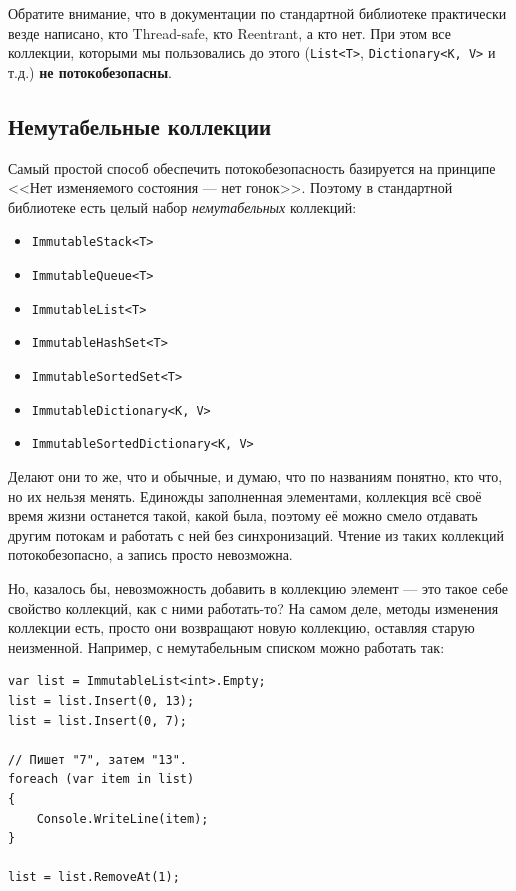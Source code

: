 \documentclass{../../text-style}
\begin{document}
Обратите внимание, что в документации по стандартной библиотеке практически везде написано, кто Thread-safe, кто Reentrant, а кто нет. При этом все коллекции, которыми мы пользовались до этого (\texttt{List<T>}, \texttt{Dictionary<K, V>} и т.д.) \textbf{не потокобезопасны}.

\subsection{Немутабельные коллекции}

Самый простой способ обеспечить потокобезопасность базируется на принципе <<Нет изменяемого состояния --- нет гонок>>. Поэтому в стандартной библиотеке есть целый набор \textit{немутабельных} коллекций:

\begin{itemize}
    \item \texttt{ImmutableStack<T>}
    \item \texttt{ImmutableQueue<T>}
    \item \texttt{ImmutableList<T>}
    \item \texttt{ImmutableHashSet<T>}
    \item \texttt{ImmutableSortedSet<T>}
    \item \texttt{ImmutableDictionary<K, V>}
    \item \texttt{ImmutableSortedDictionary<K, V>}
\end{itemize}

Делают они то же, что и обычные, и думаю, что по названиям понятно, кто что, но их нельзя менять. Единожды заполненная элементами, коллекция всё своё время жизни останется такой, какой была, поэтому её можно смело отдавать другим потокам и работать с ней без синхронизаций. Чтение из таких коллекций потокобезопасно, а запись просто невозможна. 

Но, казалось бы, невозможность добавить в коллекцию элемент --- это такое себе свойство коллекций, как с ними работать-то? На самом деле, методы изменения коллекции есть, просто они возвращают новую коллекцию, оставляя старую неизменной. Например, с немутабельным списком можно работать так:

\begin{verbatim}
var list = ImmutableList<int>.Empty;
list = list.Insert(0, 13);
list = list.Insert(0, 7);

// Пишет "7", затем "13".
foreach (var item in list)
{
    Console.WriteLine(item);
}

list = list.RemoveAt(1);
\end{verbatim}
\end{document}
